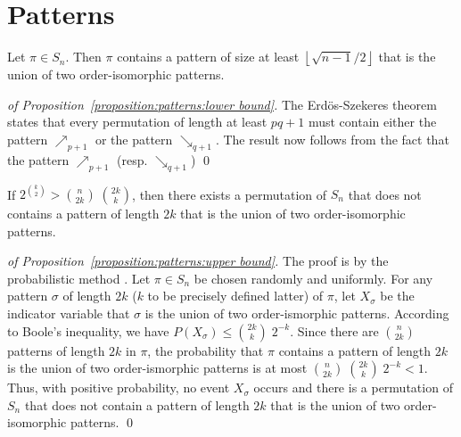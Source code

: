 \documentclass[a4paper,10pt]{llncs}
\begin{document}

\section{Patterns}
\label{section:Patterns}

\begin{proposition}
  \label{proposition:patterns:lower bound}
  Let $\pi \in S_{n}$.
  Then $\pi$ contains a pattern of size at least
  $\left\lfloor\sqrt{n-1}/2\right\rfloor$ that
  is the union of two order-isomorphic patterns.
\end{proposition}

\begin{proof}[of Proposition~\ref{proposition:patterns:lower bound}]
  The Erdös-Szekeres theorem \cite{Erdos:Szekeres:1935}
  states that every permutation of
  length at least $pq+1$ must contain either the pattern
  $\nearrow_{p+1}$ or the pattern $\searrow_{q+1}$.
  The result now follows from the fact that
  the pattern $\nearrow_{p+1}$ (resp. $\searrow_{q+1}$)
\qed
\end{proof}

\begin{proposition}
  \label{proposition:patterns:upper bound}
  If $2^{\binom{k}{2}} > \binom{n}{2k}\;\binom{2k}{k}$, then there exists
  a permutation of $S_{n}$
  that does not contains a pattern
  of length $2k$ that is the union of two
  order-isomorphic patterns.
\end{proposition}

\begin{proof}[of Proposition~\ref{proposition:patterns:upper bound}]
The proof is by the probabilistic method \cite{Alon:Spencer:1992}.
Let $\pi \in S_n$ be chosen randomly and uniformly.
For any pattern $\sigma$ of length $2k$ ($k$ to be precisely defined latter)
of $\pi$,
let $X_\sigma$ be the indicator variable that
$\sigma$ is the union of two order-ismorphic patterns.
According to Boole's inequality, we have
$P\left(X_\sigma\right) \leq \binom{2k}{k}\;2^{-k}$.
Since there are $\binom{n}{2k}$ patterns of length $2k$ in $\pi$,
the probability that $\pi$ contains a pattern of length $2k$
is the union of two order-ismorphic patterns is at most
$\binom{n}{2k}\;\binom{2k}{k}\;2^{-k} < 1$.
Thus, with positive probability, no event $X_\sigma$ occurs and
there is a permutation of $S_n$ that does not contain a pattern
of length $2k$ that is the union of two order-isomorphic patterns.
\qed
\end{proof}
\end{document}
